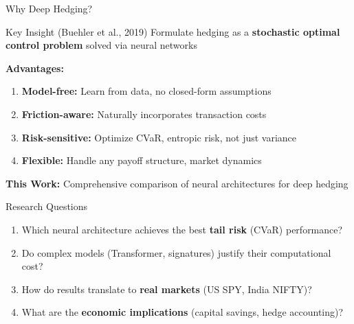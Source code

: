 \documentclass[aspectratio=169,11pt]{beamer}
\begin{document}
\begin{frame}{Why Deep Hedging?}
\begin{block}{Key Insight (Buehler et al., 2019)}
Formulate hedging as a \textbf{stochastic optimal control problem} solved via neural networks
\end{block}

\vspace{0.3cm}
\textbf{Advantages:}
\begin{enumerate}
    \item \textbf{Model-free:} Learn from data, no closed-form assumptions
    \item \textbf{Friction-aware:} Naturally incorporates transaction costs
    \item \textbf{Risk-sensitive:} Optimize CVaR, entropic risk, not just variance
    \item \textbf{Flexible:} Handle any payoff structure, market dynamics
\end{enumerate}

\vspace{0.3cm}
\textbf{This Work:} Comprehensive comparison of neural architectures for deep hedging
\end{frame}

\begin{frame}{Research Questions}
\begin{enumerate}
    \item[\textcolor{darkblue}{\textbf{Q1}}] Which neural architecture achieves the best \textbf{tail risk} (CVaR) performance?
    
    \vspace{0.3cm}
    \item[\textcolor{darkblue}{\textbf{Q2}}] Do complex models (Transformer, signatures) justify their computational cost?
    
    \vspace{0.3cm}
    \item[\textcolor{darkblue}{\textbf{Q3}}] How do results translate to \textbf{real markets} (US SPY, India NIFTY)?
    
    \vspace{0.3cm}
    \item[\textcolor{darkblue}{\textbf{Q4}}] What are the \textbf{economic implications} (capital savings, hedge accounting)?
\end{enumerate}
\end{frame}

\end{document}
